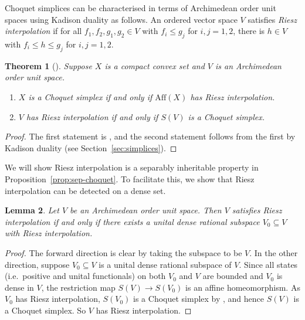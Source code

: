 \documentclass[a4paper,11pt]{amsart}
\newtheorem{theorem}{Theorem}
\newtheorem{lemma}[theorem]{Lemma}
\theoremstyle{definition}
\numberwithin{equation}{section}
\numberwithin{theorem}{section}
\begin{document}
Choquet simplices can be characterised in terms of Archimedean order unit spaces using Kadison duality as follows.  An ordered vector space $V$ satisfies \emph{Riesz interpolation} if for all $f_1, f_2, g_1, g_2 \in V$ with $f_i \leq g_j$ for $i, j = 1,2$, there is $h \in V$ with $f_i \leq h \leq g_j$ for $i, j = 1, 2$.

\begin{theorem}[{\cite[Corollary~II.3.11]{Alf71}}]\label{thm:Riesz-interp}
	Suppose $X$ is a compact convex set and $V$ is an Archimedean order unit space.
	\begin{enumerate}
		\item $X$ is a Choquet simplex if and only if $\mathrm{Aff}(X)$ has Riesz interpolation.
		\item\label{item:riesz-implies-choquet} $V$ has Riesz interpolation if and only if $S(V)$ is a Choquet simplex.
	\end{enumerate}
\end{theorem}

\begin{proof}
	The first statement is \cite[Corollary~II.3.11]{Alf71}, and the second statement follows from the first by Kadison duality (see Section~\ref{sec:simplices}).
\end{proof}

We will show Riesz interpolation is a separably inheritable property in Proposition~\ref{prop:sep-choquet}.  To facilitate this, we show that Riesz interpolation can be detected on a dense set.

\begin{lemma}\label{lem:dense-interpolation}
	Let $V$ be an Archimedean order unit space.  Then $V$ satisfies Riesz interpolation if and only if there exists a unital dense rational subspace $V_0 \subseteq V$ with Riesz interpolation.
\end{lemma}

\begin{proof}
	The forward direction is clear by taking the subspace to be $V$.  In the other direction, suppose $V_0 \subseteq V$ is a unital dense rational subspace of $V$.  Since all states (i.e.~positive and unital functionals) on both $V_0$ and $V$ are bounded and $V_0$ is dense in $V$, the restriction map $S(V) \rightarrow S(V_0)$ is an affine homeomorphism.  As $V_0$ has Riesz interpolation, $S(V_0)$ is a Choquet simplex by \cite[Corollary~10.6]{Go86}, and hence $S(V)$ is a Choquet simplex.  So $V$ has Riesz interpolation.
\end{proof}
\end{document}

